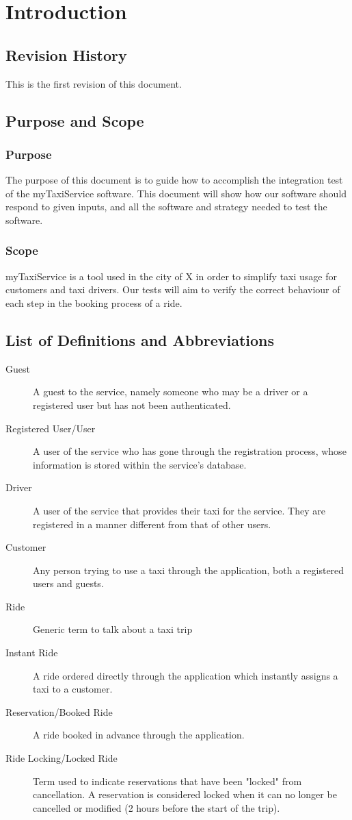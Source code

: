 \section{Introduction}
  \subsection{Revision History}
  This is the first revision of this document.
  \subsection{Purpose and Scope}
    \subsubsection{Purpose}
      The purpose of this document is to guide how to accomplish the integration test of the myTaxiService software.
      This document will show how our software should respond to given inputs, and all the software and strategy needed to test the software.
    \subsubsection{Scope}
      myTaxiService is a tool used in the city of X in order to simplify taxi usage for customers and taxi drivers. Our tests will aim to verify the correct behaviour of 
	  each step in the booking process of a ride.
  \subsection{List of Definitions and Abbreviations}
    \begin{description}
    	\item[Guest]
    		A guest to the service, namely someone who may be a driver or a registered user but has not been authenticated.
    	\item[Registered User/User]
    		A user of the service who has gone through the registration process, whose information is stored within the service's database.
    	\item[Driver]
    		A user of the service that provides their taxi for the service. They are registered in a manner different from that of other users.
    	\item[Customer]
    		Any person trying to use a taxi through the application, both a registered users and guests.
    \newpage
		\item[Ride]
    		Generic term to talk about a taxi trip
    	\item[Instant Ride]
    		A ride ordered directly through the application which instantly assigns a taxi to a customer.
    	\item[Reservation/Booked Ride]
    		A ride booked in advance through the application.
    	\item[Ride Locking/Locked Ride]
    		Term used to indicate reservations that have been "locked" from cancellation. A reservation is considered locked when it can no
    		longer be cancelled or modified (2 hours before the start of the trip).
    \end{description}
